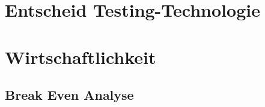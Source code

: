 \section{Entscheid Testing-Technologie}\label{entscheid-testing-technologie}

\clearpage
\section{Wirtschaftlichkeit}\label{wirtschaftlichkeit}

\subsection{Break Even Analyse}\label{break-even-analyse}
